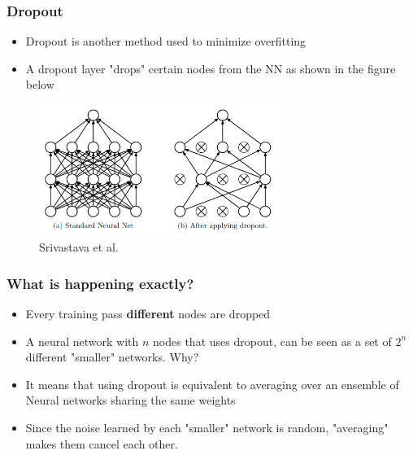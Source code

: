 \documentclass{beamer}
\begin{document}
\begin{frame}
    \frametitle{Dropout}
    \begin{itemize}
        \item Dropout is another method used to minimize overfitting 
        \item A dropout layer "drops" certain nodes from the NN as shown in the figure below
    \end{itemize}
    \begin{center}
        \begin{figure}
         \includegraphics[width=0.7\textwidth]{figs/dropout.png}
            \caption{Srivastava et al.}
        \end{figure}
    \end{center}
    
\end{frame}
\begin{frame}
    \frametitle{What is happening exactly?}
    \begin{itemize}
        \item Every training pass \textbf{different} nodes are dropped 
        \item A neural network with $n$ nodes that uses dropout, can be seen as a set of $2^n$ different "smaller" networks. Why?
        \item It means that using dropout is equivalent to averaging over an ensemble of Neural networks sharing the same weights
        \item Since the noise learned by each "smaller" network is random, "averaging" makes them cancel each other.
    \end{itemize}

\end{frame}
\end{document}
